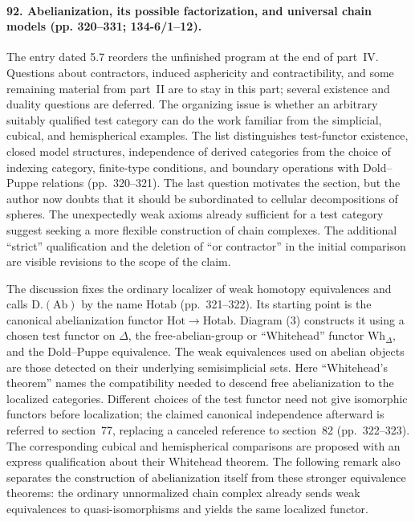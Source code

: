 \paragraph{92. Abelianization, its possible factorization, and universal chain models (pp. 320--331; 134-6/1--12).}
The entry dated 5.7 reorders the unfinished program at the end of part~IV. Questions about contractors, induced asphericity and contractibility, and some remaining material from part~II are to stay in this part; several existence and duality questions are deferred. The organizing issue is whether an arbitrary suitably qualified test category can do the work familiar from the simplicial, cubical, and hemispherical examples. The list distinguishes test-functor existence, closed model structures, independence of derived categories from the choice of indexing category, finite-type conditions, and boundary operations with Dold--Puppe relations (pp.~320--321). The last question motivates the section, but the author now doubts that it should be subordinated to cellular decompositions of spheres. The unexpectedly weak axioms already sufficient for a test category suggest seeking a more flexible construction of chain complexes. The additional ``strict'' qualification and the deletion of ``or contractor'' in the initial comparison are visible revisions to the scope of the claim.

The discussion fixes the ordinary localizer of weak homotopy equivalences and calls $\mathrm{D.}(\mathrm{Ab})$ by the name $\mathrm{Hotab}$ (pp.~321--322). Its starting point is the canonical abelianization functor $\mathrm{Hot}\to\mathrm{Hotab}$. Diagram (3) constructs it using a chosen test functor on $\Delta$, the free-abelian-group or ``Whitehead'' functor $\mathrm{Wh}_{\Delta}$, and the Dold--Puppe equivalence. The weak equivalences used on abelian objects are those detected on their underlying semisimplicial sets. Here ``Whitehead's theorem'' names the compatibility needed to descend free abelianization to the localized categories. Different choices of the test functor need not give isomorphic functors before localization; the claimed canonical independence afterward is referred to section~77, replacing a canceled reference to section~82 (pp.~322--323). The corresponding cubical and hemispherical comparisons are proposed with an express qualification about their Whitehead theorem. The following remark also separates the construction of abelianization itself from these stronger equivalence theorems: the ordinary unnormalized chain complex already sends weak equivalences to quasi-isomorphisms and yields the same localized functor.


